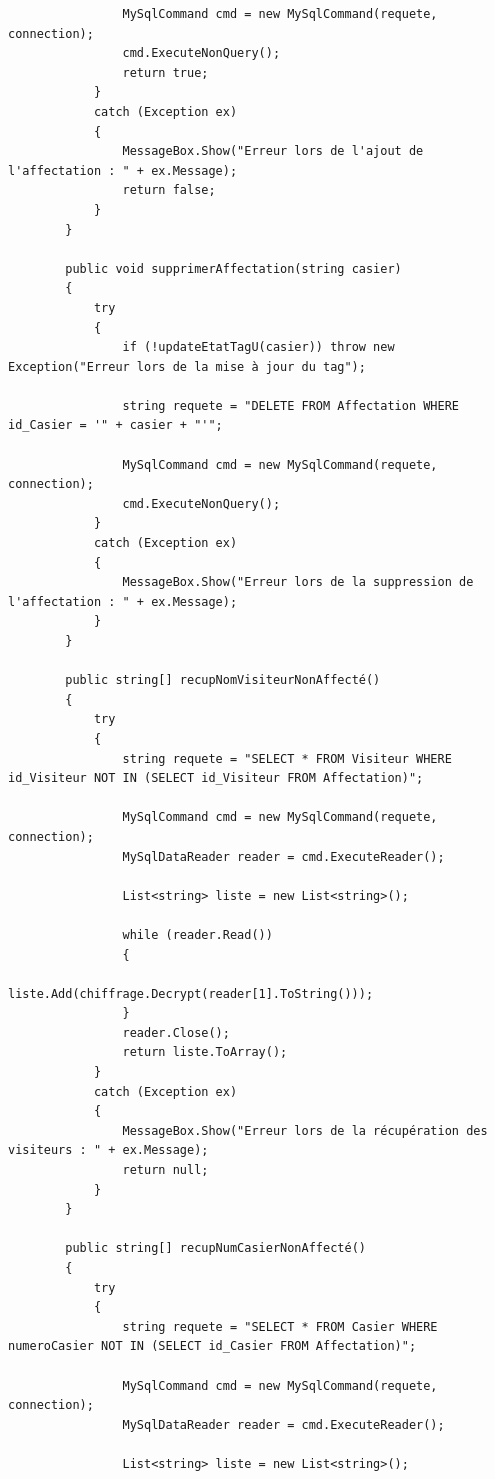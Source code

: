\documentclass[main.tex]{subfiles}
\begin{document}
\begin{lstlisting}
                MySqlCommand cmd = new MySqlCommand(requete, connection);
                cmd.ExecuteNonQuery();
                return true;
            }
            catch (Exception ex)
            {
                MessageBox.Show("Erreur lors de l'ajout de l'affectation : " + ex.Message);
                return false;
            }
        }

        public void supprimerAffectation(string casier)
        {
            try
            {
                if (!updateEtatTagU(casier)) throw new Exception("Erreur lors de la mise à jour du tag");

                string requete = "DELETE FROM Affectation WHERE id_Casier = '" + casier + "'";

                MySqlCommand cmd = new MySqlCommand(requete, connection);
                cmd.ExecuteNonQuery();
            }
            catch (Exception ex)
            {
                MessageBox.Show("Erreur lors de la suppression de l'affectation : " + ex.Message);
            }
        }

        public string[] recupNomVisiteurNonAffecté()
        {
            try
            {
                string requete = "SELECT * FROM Visiteur WHERE id_Visiteur NOT IN (SELECT id_Visiteur FROM Affectation)";

                MySqlCommand cmd = new MySqlCommand(requete, connection);
                MySqlDataReader reader = cmd.ExecuteReader();

                List<string> liste = new List<string>();

                while (reader.Read())
                {
                    liste.Add(chiffrage.Decrypt(reader[1].ToString()));
                }
                reader.Close();
                return liste.ToArray();
            }
            catch (Exception ex)
            {
                MessageBox.Show("Erreur lors de la récupération des visiteurs : " + ex.Message);
                return null;
            }   
        }

        public string[] recupNumCasierNonAffecté()
        {
            try
            {
                string requete = "SELECT * FROM Casier WHERE numeroCasier NOT IN (SELECT id_Casier FROM Affectation)";

                MySqlCommand cmd = new MySqlCommand(requete, connection);
                MySqlDataReader reader = cmd.ExecuteReader();

                List<string> liste = new List<string>();


\end{lstlisting}
\end{document}
